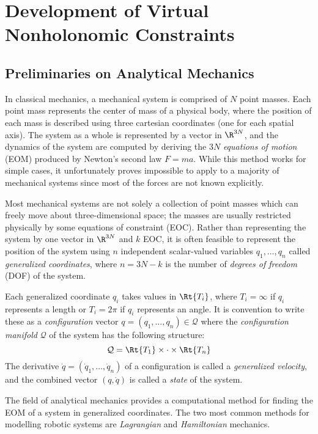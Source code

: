 

\chapter{Development of Virtual Nonholonomic Constraints}
\section{Preliminaries on Analytical Mechanics}
In classical mechanics, a mechanical system is comprised of \(N\) point masses.
Each point mass represents the center of mass of a physical body, where the
position of each mass is described using three cartesian coordinates (one for
each spatial axis).  The system as a whole is represented by a vector in
\(\R^{3N}\), and the dynamics of the system are computed by deriving the \(3N\)
\textit{equations of motion} (EOM) produced by Newton's second law \(F = m a\).
While this method works for simple cases, it unfortunately proves impossible to
apply to a majority of mechanical systems since most of the forces are not known
explicitly. 

Most mechanical systems are not solely a collection of point masses which can 
freely move about three-dimensional space; the masses are usually restricted
physically by some equations of constraint (EOC). 
Rather than representing the system by one vector in \(\R^{3N}\) and \(k\) EOC, 
it is often feasible to represent the position of the system using \(n\)
independent scalar-valued variables \(q_1,\ldots,q_n\) called 
\textit{generalized coordinates}, where \(n = 3N - k\) is the number of
\textit{degrees of freedom} (DOF) of the system.

Each generalized coordinate \(q_i\) takes values in \(\Rt{T_i}\), where
\(T_i = \infty\) if \(q_i\) represents a length or \(T_i = 2\pi\) if \(q_i\)
represents an angle.
It is convention to write these as a \textit{configuration} vector 
\(q = (q_1,\ldots,q_n) \in \mathcal{Q}\) 
where the \textit{configuration manifold} \(\mathcal{Q}\) of the system has the
following structure:
\[
    \mathcal{Q} = \Rt{T_1} \times \cdot \times \Rt{T_n}
\] 
The derivative \(\dot{q} = (\dot{q}_1,\ldots,\dot{q}_n)\) of a configuration
is called a \textit{generalized velocity}, and the combined vector
\((q,\dot{q})\) is called a \textit{state} of the system.

The field of analytical mechanics provides a computational method for finding
the EOM of a system in generalized coordinates. The two most common methods for
modelling robotic systems are \textit{Lagrangian} and \textit{Hamiltonian}
mechanics.

